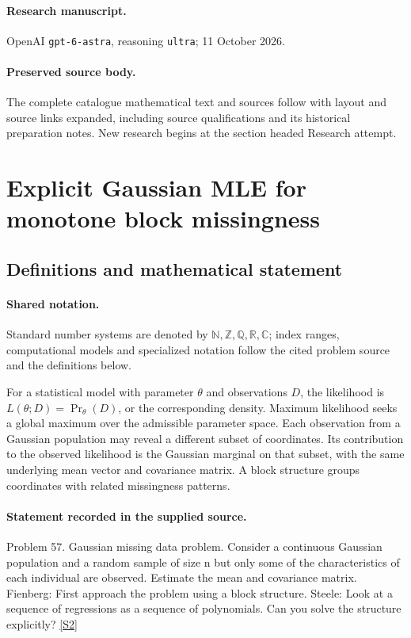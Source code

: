 \documentclass[11pt]{article}
\begin{document}
\paragraph{Research manuscript.} OpenAI \texttt{gpt-6-astra}, reasoning \texttt{ultra}; 11 October 2026.
\paragraph{Preserved source body.} The complete catalogue mathematical text and sources follow with layout and source links expanded, including source qualifications and its historical preparation notes. New research begins at the section headed Research attempt.

\section{Explicit Gaussian MLE for monotone block missingness}\label{statement}

\subsection{Definitions and mathematical statement}

\paragraph{Shared notation.}Standard number systems are denoted by $\mathbb N,\mathbb Z,\mathbb Q,\mathbb R,\mathbb C$; index ranges, computational models and specialized notation follow the cited problem source and the definitions below.


For a statistical model with parameter $\theta$ and observations $D$, the likelihood is $L(\theta;D)=\Pr_\theta(D)$, or the corresponding density. Maximum likelihood seeks a global maximum over the admissible parameter space. Each observation from a Gaussian population may reveal a different subset of coordinates. Its contribution to the observed likelihood is the Gaussian marginal on that subset, with the same underlying mean vector and covariance matrix. A block structure groups coordinates with related missingness patterns.
\paragraph{Statement recorded in the supplied source.}
Problem 57. Gaussian missing data problem. Consider a continuous Gaussian population and a random sample of size n but only some of the characteristics of each individual are observed. Estimate the mean and covariance matrix. Fienberg: First approach the problem using a block structure. Steele: Look at a sequence of regressions as a sequence of polynomials. Can you solve the structure explicitly? \href{https://aimath.org/WWN/compalgstat/compalgstat.pdf}{[S2]}
\end{document}
